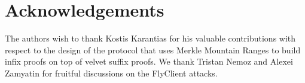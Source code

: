 \section{Acknowledgements}

The authors wish to thank Kostis Karantias for his valuable contributions with respect to
the design of the protocol that uses Merkle Mountain Ranges to build infix proofs on top
of velvet suffix proofs. We thank Tristan Nemoz and Alexei Zamyatin for fruitful discussions
on the FlyClient attacks.
